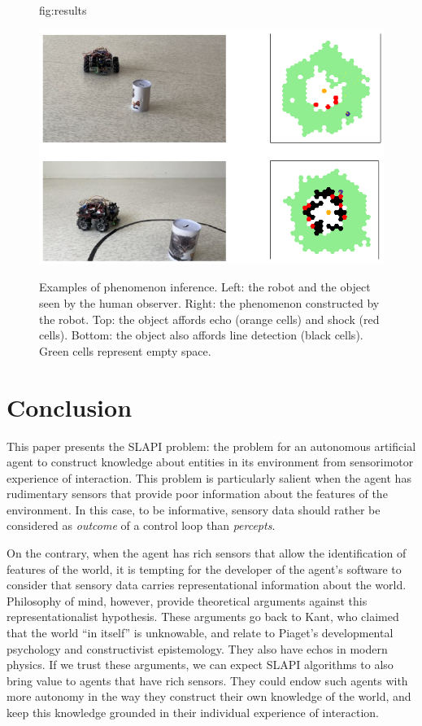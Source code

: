 \documentclass[pmlr]{jmlr}%
\begin{document}
\begin{figure}[htbp]
	\floatconts
	{fig:results}
	{\caption{Examples of phenomenon inference.
			  Left: the robot and the object seen by the human observer.
			  Right: the phenomenon constructed by the robot. 
			  Top: the object affords echo (orange cells) and shock (red cells). 
			  Bottom: the object also affords line detection (black cells). 
			  Green cells represent empty space.}}
	{\includegraphics[width=0.6\linewidth]{images/Figure_3_results}}
\end{figure}


\section{Conclusion}

This paper presents the SLAPI problem: the problem for an autonomous artificial agent to construct knowledge about entities in its environment from sensorimotor experience of interaction.  
This problem is particularly salient when the agent has rudimentary sensors that provide poor information about the features of the environment. 
In this case, to be informative, sensory data should rather be considered as \textit{outcome} of a control loop than \textit{percepts}.

On the contrary, when the agent has rich sensors that allow the identification of features of the world, it is tempting for the developer of the agent's software to consider that sensory data carries representational information about the world. 
Philosophy of mind, however, provide theoretical arguments against this representationalist hypothesis. 
These arguments go back to Kant, who claimed that the world ``in itself'' is unknowable, and relate to Piaget's developmental psychology and constructivist epistemology. 
They also have echos in modern physics. 
If we trust these arguments, we can expect SLAPI algorithms to also bring value to agents that have rich sensors. 
They could endow such agents with more autonomy in the way they construct their own knowledge of the world, and keep this knowledge grounded in their individual experience of interaction.
\end{document}
